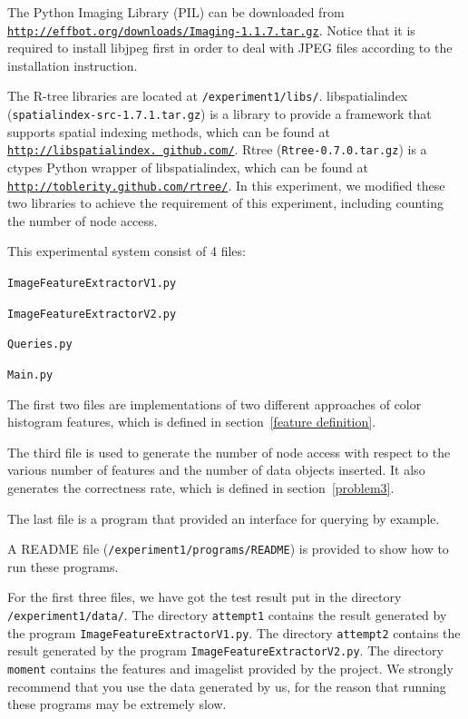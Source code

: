 \documentclass{acm_proc_article-sp}
\begin{document}
The Python Imaging Library (PIL)\cite{website:PIL} can be downloaded from \texttt{\url{http://effbot.org/downloads/Imaging-1.1.7.tar.gz}}. Notice that it is required to install libjpeg first in order to deal with JPEG files according to the installation instruction.

The R-tree libraries are located at \texttt{/experiment1/libs/}. libspatialindex (\texttt{spatialindex-src-1.7.1.tar.gz})\cite{website:si} is a library to provide a framework that supports spatial indexing methods, which can be found at \texttt{\href{http://libspatialindex.github.com/}{http://libspatialindex. github.com/}}. Rtree (\texttt{Rtree-0.7.0.tar.gz})\cite{website:rtree} is a ctypes Python wrapper of libspatialindex, which can be found at \texttt{\url{http://toblerity.github.com/rtree/}}. In this experiment, we modified these two libraries to achieve the requirement of this experiment, including counting the number of node access.

This experimental system consist of 4 files:

\begin{itemize*}
  \item \texttt{ImageFeatureExtractorV1.py}
  \item \texttt{ImageFeatureExtractorV2.py}
  \item \texttt{Queries.py}
  \item \texttt{Main.py}
\end{itemize*}

The first two files are implementations of two different approaches of color histogram features, which is defined in section~\ref{feature definition}.

The third file is used to generate the number of node access with respect to the various number of features and the number of data objects inserted. It also generates the correctness rate, which is defined in section~\ref{problem3}.

The last file is a program that provided an interface for querying by example.

A README file (\texttt{/experiment1/programs/README}) is provided to show how to run these programs.

For the first three files, we have got the test result put in the directory \texttt{/experiment1/data/}. The directory \texttt{attempt1} contains the result generated by the program \texttt{ImageFeatureExtractorV1.py}. The directory \texttt{attempt2} contains the result generated by the program \texttt{ImageFeatureExtractorV2.py}. The directory \texttt{moment} contains the features and imagelist provided by the project. We strongly recommend that you use the data generated by us, for the reason that running these programs may be extremely slow.
\end{document}
